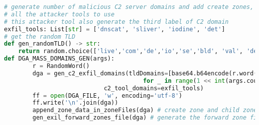\documentclass [11pt, proquest] {uwthesis}[2020/02/24]
\begin{document}
\vspace{-0.5em}
{\footnotesize
\begin{lstlisting}[language=Python, 
    caption={Domain Generation Algorithm}, 
    label={lst:dga},
    aboveskip=0.5em,
    belowskip=0.5em
]
# generate number of malicious C2 server domains and add create zones, child zones NS links inside DNS server
# all the attacker tools to use 
# this attacker tool also generate the third label of C2 domain
exfil_tools: List[str] = ['dnscat', 'sliver', 'iodine', 'det']
# get the random TLD
def gen_randomTLD() -> str:
    return random.choice(['live','com','de','io','se','bld', 'val', 'def', 'head'])
def DGA_MASS_DOMAINS_GEN(args):
        r = RandomWord()
        dga = gen_c2_exfil_domains(tldDomains=[base64.b64encode(r.word()).lower() + "." + gen_randomTLD()
                                       for _ in range(1 << int(args.count))], 
                            c2_tool_domains=exfil_tools)
        ff = open(DGA_FILE, 'w', encoding='utf-8')
        ff.write('\n'.join(dga))
        append_zone_data_in_zoneFiles(dga) # create zone and child zones for PowerDNS Authoritative zone
        gen_exil_forward_zones_file(dga) # generate the forward zone file for PowerDNS Recursor
\end{lstlisting}
}
\end{document}
